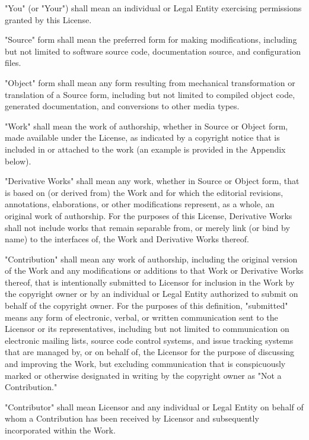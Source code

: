 \documentclass[twoside]{tceusermanual}
\begin{document}
      "You" (or "Your") shall mean an individual or Legal Entity
      exercising permissions granted by this License.

      "Source" form shall mean the preferred form for making modifications,
      including but not limited to software source code, documentation
      source, and configuration files.

      "Object" form shall mean any form resulting from mechanical
      transformation or translation of a Source form, including but
      not limited to compiled object code, generated documentation,
      and conversions to other media types.

      "Work" shall mean the work of authorship, whether in Source or
      Object form, made available under the License, as indicated by a
      copyright notice that is included in or attached to the work
      (an example is provided in the Appendix below).

      "Derivative Works" shall mean any work, whether in Source or Object
      form, that is based on (or derived from) the Work and for which the
      editorial revisions, annotations, elaborations, or other modifications
      represent, as a whole, an original work of authorship. For the purposes
      of this License, Derivative Works shall not include works that remain
      separable from, or merely link (or bind by name) to the interfaces of,
      the Work and Derivative Works thereof.

      "Contribution" shall mean any work of authorship, including
      the original version of the Work and any modifications or additions
      to that Work or Derivative Works thereof, that is intentionally
      submitted to Licensor for inclusion in the Work by the copyright owner
      or by an individual or Legal Entity authorized to submit on behalf of
      the copyright owner. For the purposes of this definition, "submitted"
      means any form of electronic, verbal, or written communication sent
      to the Licensor or its representatives, including but not limited to
      communication on electronic mailing lists, source code control systems,
      and issue tracking systems that are managed by, or on behalf of, the
      Licensor for the purpose of discussing and improving the Work, but
      excluding communication that is conspicuously marked or otherwise
      designated in writing by the copyright owner as "Not a Contribution."

      "Contributor" shall mean Licensor and any individual or Legal Entity
      on behalf of whom a Contribution has been received by Licensor and
      subsequently incorporated within the Work.
\end{document}
